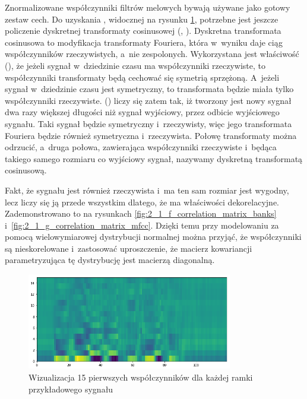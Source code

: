 Znormalizowane współczynniki filtrów melowych bywają używane jako gotowy zestaw cech. Do uzyskania ,
widocznej na rysunku \ref{fig:2_1_e_mfcc},
potrzebne jest jeszcze policzenie dyskretnej transformaty cosinusowej (,
). Dyskretna transformata cosinusowa to modyfikacja
transformaty Fouriera, która w~wyniku daje ciąg współczynników rzeczywistych, a~nie zespolonych. Wykorzystana jest
właściwość  (), że jeżeli sygnał w~dziedzinie czasu ma
współczynniki rzeczywiste, to współczynniki transformaty
będą cechować się symetrią sprzężoną. A~jeżeli sygnał w~dziedzinie czasu jest symetryczny,
to transformata będzie miała tylko współczynniki rzeczywiste. 
() liczy się zatem tak,
iż tworzony jest nowy sygnał dwa razy większej długości niż
sygnał wyjściowy, przez odbicie wyjściowego sygnału. Taki sygnał będzie symetryczny i~rzeczywisty, więc jego transformata
Fouriera będzie również symetryczna i~rzeczywista. Połowę transformaty można odrzucić, a~druga połowa, zawierająca
współczynniki rzeczywiste i~będąca takiego samego rozmiaru co wyjściowy sygnał, nazywamy dyskretną transformatą cosinusową.

Fakt, że  sygnału jest również rzeczywista i~ma ten sam rozmiar jest wygodny, lecz liczy się
ją przede wszystkim dlatego, że ma właściwości dekorelacyjne. Zademonstrowano to na rysunkach
\ref{fig:2_1_f_correlation_matrix_banks} i~\ref{fig:2_1_g_correlation_matrix_mfcc}.
Dzięki temu przy modelowaniu  za pomocą wielowymiarowej
dystrybucji normalnej można przyjąć, że
współczynniki są nieskorelowane i~zastosować uproszczenie, że macierz kowariancji parametryzująca tę dystrybucję
jest macierzą diagonalną.

\begin{figure}[H]
    \centering
    \includegraphics[width=0.8\textwidth]{images/2_1_e_mfcc}
    \caption{Wizualizacja 15 pierwszych współczynników  dla każdej ramki przykładowego sygnału}
    \label{fig:2_1_e_mfcc}
\end{figure}

